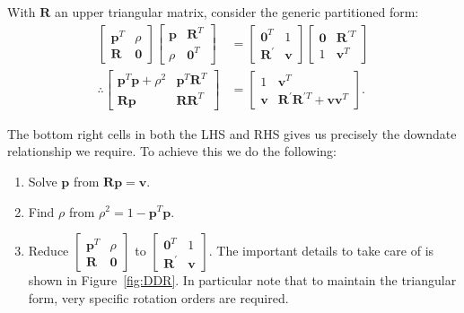 \documentclass[oneside,english]{scrbook}
\begin{document}
With $\bm{R}$ an upper triangular matrix, consider the generic partitioned form:
\begin{align*}
  \begin{bmatrix}
    \bm{p}^T & \rho\\
    \bm{R} & \bm{0}
  \end{bmatrix}
  \begin{bmatrix}
    \bm{p} & \bm{R}^T\\
    \rho & \bm{0}^T
  \end{bmatrix}
  &=
  \begin{bmatrix}
    \bm{0}^T & 1\\
    \bm{R}^{'} & \bm{v}
  \end{bmatrix}
  \begin{bmatrix}
    \bm{0} & \bm{R}^{'T}\\
    1 & \bm{v}^T
  \end{bmatrix}\\
  \therefore
  \begin{bmatrix}
    \bm{p}^T\bm{p} + \rho^2 & \bm{p}^T\bm{R}^T\\
    \bm{R}\bm{p} & \bm{R}\bm{R}^T
  \end{bmatrix}
  &=
  \begin{bmatrix}
    1 & \bm{v}^T\\
    \bm{v} & \bm{R}^{'}\bm{R}^{'T}+\bm{v}\bm{v}^T
  \end{bmatrix}.
\end{align*}

The bottom right cells in both the LHS and RHS gives us precisely the
downdate relationship we require. To achieve this we do the following:
\begin{enumerate}
\item Solve $\bm{p}$ from $\bm{R}\bm{p} = \bm{v} $.
\item Find $\rho$ from $\rho^2 = 1- \bm{p}^T\bm{p}$.
\item Reduce
  $\begin{bmatrix}
  \bm{p}^T & \rho\\
  \bm{R} & \bm{0}
  \end{bmatrix}$
  to
  $\begin{bmatrix}
    \bm{0}^T & 1\\
    \bm{R}^{'} & \bm{v}
  \end{bmatrix}$.
  The important details to take care of is shown in
  Figure~\ref{fig:DDR}. In particular note that to maintain the
  triangular form, very specific rotation orders are required.
\end{enumerate}
\end{document}

